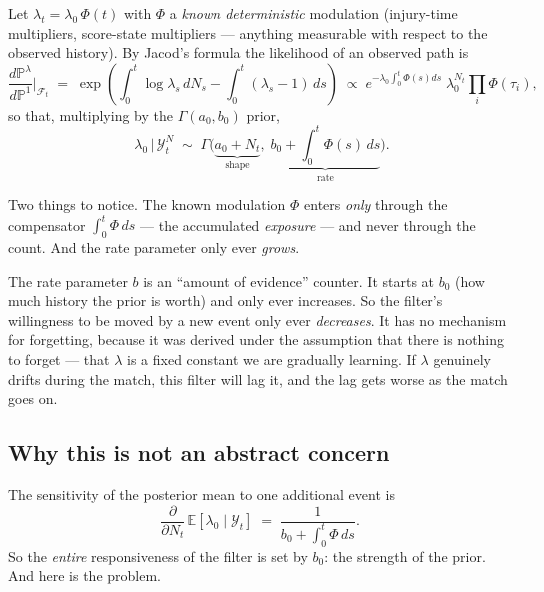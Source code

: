 \documentclass[11pt,a4paper]{article}
\theoremstyle{plain}
\begin{document}
Let $\lambda_t = \lambda_0\,\Phi(t)$ with $\Phi$ a \emph{known deterministic} modulation
(injury-time multipliers, score-state multipliers --- anything measurable with respect to the
observed history). By Jacod's formula the likelihood of an observed path is
\[
  \frac{d\mathbb{P}^\lambda}{d\mathbb{P}^1}\bigg|_{\mathcal{F}_t}
  \;=\; \exp\!\left(\int_0^t \log\lambda_s\,dN_s - \int_0^t(\lambda_s-1)\,ds\right)
  \;\propto\; e^{-\lambda_0\int_0^t\Phi(s)ds}\;\lambda_0^{N_t}\prod_{i}\Phi(\tau_i),
\]
so that, multiplying by the $\Gamma(a_0,b_0)$ prior,
\begin{equation}
\boxed{\;
  \lambda_0 \,\big|\, \mathcal{Y}^N_t \;\sim\;
  \Gamma\Big(\underbrace{a_0 + N_t}_{\text{shape}},\;
             \underbrace{b_0 + \textstyle\int_0^t\Phi(s)\,ds}_{\text{rate}}\Big).}
\label{eq:conj}
\end{equation}

Two things to notice. The known modulation $\Phi$ enters \emph{only} through the compensator
$\int_0^t\Phi\,ds$ --- the accumulated \emph{exposure} --- and never through the count. And
the rate parameter only ever \emph{grows}.

\begin{plain}
The rate parameter $b$ is an ``amount of evidence'' counter. It starts at $b_0$ (how much
history the prior is worth) and only ever increases. So the filter's willingness to be moved
by a new event only ever \emph{decreases}. It has no mechanism for forgetting, because it was
derived under the assumption that there is nothing to forget --- that $\lambda$ is a fixed
constant we are gradually learning. If $\lambda$ genuinely drifts during the match, this filter
will lag it, and the lag gets worse as the match goes on.
\end{plain}

\subsection*{Why this is not an abstract concern}

The sensitivity of the posterior mean to one additional event is
\[
  \frac{\partial}{\partial N_t}\,\mathbb{E}[\lambda_0\mid\mathcal{Y}_t]
  \;=\; \frac{1}{b_0 + \int_0^t \Phi\,ds}.
\]
So the \emph{entire} responsiveness of the filter is set by $b_0$: the strength of the prior.
And here is the problem.
\end{document}
